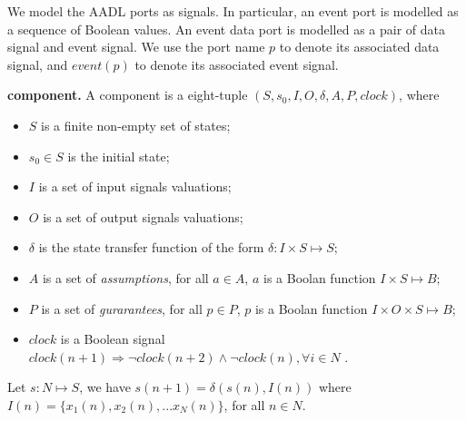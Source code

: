 We model the AADL ports as signals. In particular, an event port is modelled as a sequence of Boolean values. %
An event data port is modelled as a pair of data signal and event signal. We use the port name $p$ to denote its associated data signal, and $event(p)$ to denote its associated event signal. 

{\bf component.}
A component is a eight-tuple $(S, s_0, I, O, \delta, A, P, clock)$, where 
\begin{itemize}
    	\item $S$ is a finite non-empty set of states;
    	\item $s_0 \in S$ is the initial state;
    	\item $I$ is a set of input signals valuations;
    	\item $O$ is a set of output signals valuations;
    	\item $\delta$ is the state transfer function of the form $\delta: I \times S \mapsto S$;
    	\item $A$ is a set of \emph{assumptions}, for all $a \in A$, $a$ is a Boolan function $I \times S \mapsto B$;
    	\item $P$ is a set of \emph{gurarantees}, for all $p \in P$, $p$ is a Boolan function $I \times O \times S \mapsto B$;
	\item $clock$ is a Boolean signal $clock(n+1) \Rightarrow \lnot clock(n+2) \land  \lnot clock(n), \forall i \in N$ .
\end{itemize}

Let $s: N \mapsto S$, we have $ s(n+1) = \delta (s(n), I(n))$ 
where $I(n) = \{x_1(n), x_2(n), ... x_N(n)\}$, for all $n \in N$. 
  

